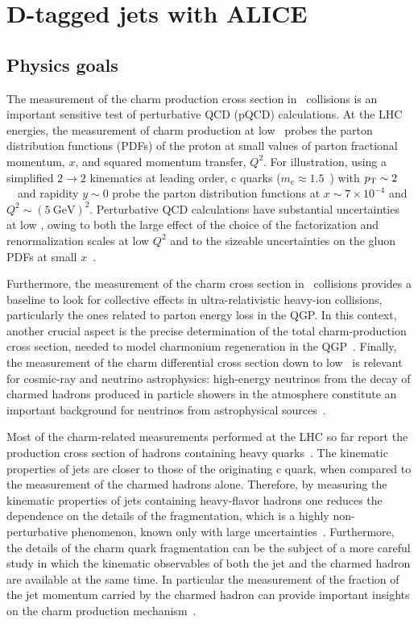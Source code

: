 \documentclass[12pt, a4paper, twoside, titlepage]{article}
\begin{document}
\section{D-tagged jets with ALICE}
\subsection{Physics goals}
The measurement of the charm production cross section in \pp\ collisions is an important sensitive test of perturbative QCD (pQCD) calculations.
At the LHC energies, the measurement of charm production at low \pt\ probes the parton distribution functions (PDFs)
of the proton at small values of parton fractional momentum, $x$, and squared momentum transfer, $Q^2$.
For illustration, using a simplified $2 \rightarrow 2$ kinematics at leading order, c quarks ($m_{\mathrm{c}} \approx 1.5$~\GeVcsq) with
$p_{\rm T} \sim 2$~\GeVc\ and rapidity $y \sim 0$ probe the parton distribution functions at $x \sim 7 \times 10^{-4}$ and
$Q^2 \sim (5~\mathrm{GeV})^2$.
Perturbative QCD calculations have substantial uncertainties at low \pt, owing to both the large effect of the
choice of the factorization and renormalization scales at low $Q^2$ and to the sizeable uncertainties on the
gluon PDFs at small $x$~\cite{Cacciari:2015}. 

Furthermore, the measurement of the charm cross section in \pp\ collisions provides a baseline to look for collective effects in ultra-relativistic
heavy-ion collisions, particularly the ones related to parton energy loss in the QGP. In this context, another crucial aspect is the precise determination of the
total charm-production cross section, needed to model charmonium regeneration in the QGP~\cite{Zhao:2011}.
Finally, the measurement of the charm differential cross section down to low \pt\ is relevant for cosmic-ray and neutrino
astrophysics: high-energy neutrinos from the decay of charmed hadrons produced in particle showers in the atmosphere constitute an important
background for neutrinos from astrophysical sources~\cite{Gauld:2015, Bhattacharya:2015}.

Most of the charm-related measurements performed at the LHC so far report the production cross section of hadrons
containing heavy quarks~\cite{ALICE:2012d, ALICE:2012e, ATLAS:2012e, LHCb:2013a, ALICE:2014d, ATLAS:2014e, ALICE:2015c, ALICE:2015d, ALICE:2016a, ATLAS:2016a}.
The kinematic properties of jets are closer to those of the originating c quark, when compared to the measurement of the charmed hadrons alone.
Therefore, by measuring the kinematic properties of jets containing heavy-flavor hadrons 
one reduces the dependence on the details of the fragmentation, which is a highly non-perturbative phenomenon, known only with large uncertainties~\cite{dEnterria:2014}.
Furthermore, the details of the charm quark fragmentation can be the subject of a more careful study in which the kinematic observables 
of both the jet and the charmed hadron are available at the same time. In particular the measurement of the fraction of the jet momentum carried 
by the charmed hadron can provide important insights on the charm production mechanism~\cite{CDF:1990, UA1:1990, STAR:2009a, ATLAS:2012d}.
\end{document}
